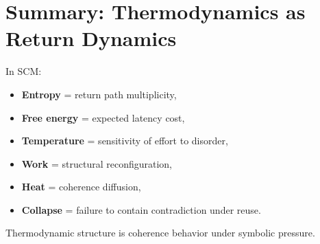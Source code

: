 \section{Summary: Thermodynamics as Return Dynamics} \label{sec:thermo-summary}

In SCM:
\begin{itemize}
  \item \textbf{Entropy} = return path multiplicity,
  \item \textbf{Free energy} = expected latency cost,
  \item \textbf{Temperature} = sensitivity of effort to disorder,
  \item \textbf{Work} = structural reconfiguration,
  \item \textbf{Heat} = coherence diffusion,
  \item \textbf{Collapse} = failure to contain contradiction under reuse.
\end{itemize}

Thermodynamic structure is coherence behavior under symbolic pressure.
